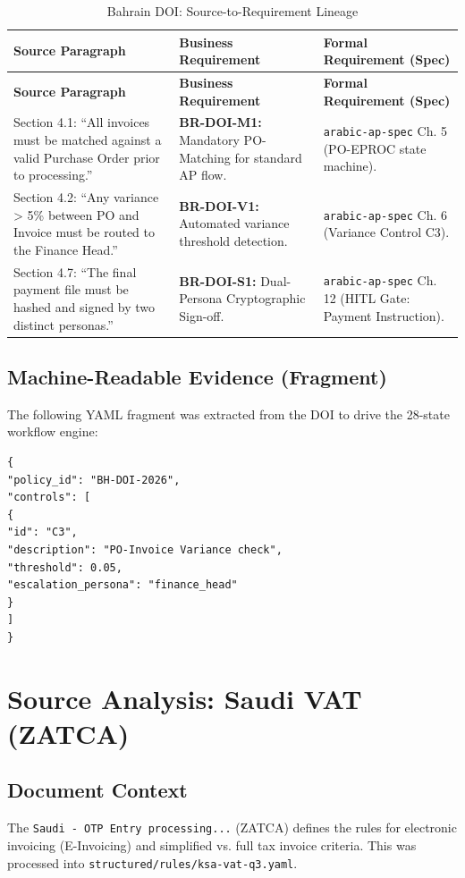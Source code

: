 \documentclass[11pt,a4paper,twoside]{report}
\begin{document}
\begin{longtable}{p{5cm} p{5cm} p{5cm}}
\caption{Bahrain DOI: Source-to-Requirement Lineage} \\
\toprule
\textbf{Source Paragraph} & \textbf{Business Requirement} & \textbf{Formal Requirement (Spec)} \\
\midrule
\endfirsthead
\toprule
\textbf{Source Paragraph} & \textbf{Business Requirement} & \textbf{Formal Requirement (Spec)} \\
\midrule
\endhead
Section 4.1: ``All invoices must be matched against a valid Purchase Order prior to processing.'' & \textbf{BR-DOI-M1:} Mandatory PO-Matching for standard AP flow. & \texttt{arabic-ap-spec} Ch. 5 (PO-EPROC state machine). \\
\midrule
Section 4.2: ``Any variance > 5\% between PO and Invoice must be routed to the Finance Head.'' & \textbf{BR-DOI-V1:} Automated variance threshold detection. & \texttt{arabic-ap-spec} Ch. 6 (Variance Control C3). \\
\midrule
Section 4.7: ``The final payment file must be hashed and signed by two distinct personas.'' & \textbf{BR-DOI-S1:} Dual-Persona Cryptographic Sign-off. & \texttt{arabic-ap-spec} Ch. 12 (HITL Gate: Payment Instruction). \\
\bottomrule
\end{longtable}

\section{Machine-Readable Evidence (Fragment)}
The following YAML fragment was extracted from the DOI to drive the 28-state workflow engine:

\begin{lstlisting}[language=jsonx]
{
"policy_id": "BH-DOI-2026",
"controls": [
{
"id": "C3",
"description": "PO-Invoice Variance check",
"threshold": 0.05,
"escalation_persona": "finance_head"
}
]
}
\end{lstlisting}
\chapter{Source Analysis: Saudi VAT (ZATCA)}
\label{ch:analysis-sa-vat}

\section{Document Context}
The \texttt{Saudi - OTP Entry processing...} (ZATCA) defines the rules for electronic invoicing (E-Invoicing) and simplified vs. full tax invoice criteria. This was processed into \texttt{structured/rules/ksa-vat-q3.yaml}.
\end{document}
